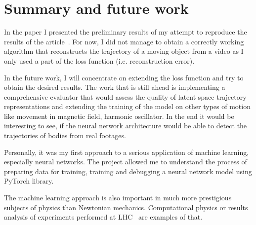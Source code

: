 \documentclass[12pt,letterpaper]{article}
\begin{document}
\section{Summary and future work}

In the paper I presented the preliminary results of my attempt to reproduce the results of the article~\cite{Udrescu2021}. For now, I did not manage to obtain a correctly working algorithm that reconstructs the trajectory of a moving object from a video as I only used a part of the loss function (i.e. reconstruction error).

In the future work, I will concentrate on extending the loss function and try to obtain the desired results. The work that is still ahead is implementing a comprehensive evaluator that would assess the quality of latent space trajectory representations and extending the training of the model on other types of motion like movement in magnetic field, harmonic oscillator. In the end it would be interesting to see, if the neural network architecture would be able to detect the trajectories of bodies from real footages. 

Personally, it was my first approach to a serious application of machine learning, especially neural networks. The project allowed me to understand the process of preparing data for training, training and debugging a neural network model using PyTorch library.

The machine learning approach is also important in much more prestigious subjects of physics than Newtonian mechanics. Computational physics or results analysis of experiments performed at LHC~\cite{ARPAIA2021} are examples of that.  

\printbibliography
\end{document}
